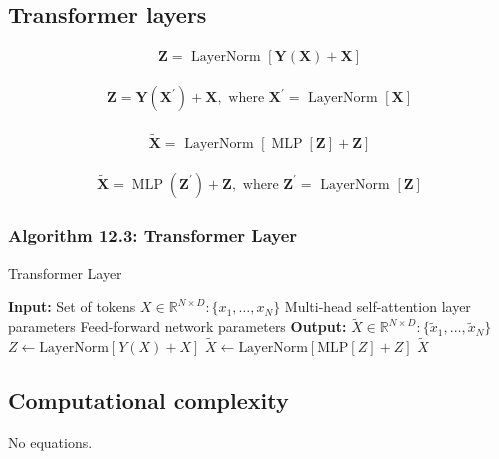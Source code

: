 \documentclass{article}
\begin{document}
\subsection{Transformer layers}
\begin{align*}
\mathbf{Z}=\text{ LayerNorm }[
\mathbf{Y}(\mathbf{X})+\mathbf{X}] \tag{12.20}
\end{align*}

\begin{align*}
\mathbf{Z}=\mathbf{Y}\left(\mathbf{X}^{\prime}\right)+\mathbf{X}, \text{ where } \mathbf{X}^{\prime}=\text{ LayerNorm }[
\mathbf{X}] \tag{12.21}
\end{align*}

\begin{align*}
\widetilde{\mathbf{X}}=\text{ LayerNorm }[
\operatorname{MLP}[
\mathbf{Z}]
+\mathbf{Z}] \tag{12.22}
\end{align*}

\begin{align*}
\widetilde{\mathbf{X}}=\operatorname{MLP}\left(\mathbf{Z}^{\prime}\right)+\mathbf{Z}, \text{ where } \mathbf{Z}^{\prime}=\text{ LayerNorm }[
\mathbf{Z}] \tag{12.23}
\end{align*}

\subsubsection{Algorithm 12.3: Transformer Layer}

\begin{algorithm}[H]
\caption{Transformer Layer}
\begin{algorithmic}[1]
\STATE \textbf{Input:} Set of tokens $X \in \mathbb{R}^{N \times D} : \{x_1, \ldots, x_N\}$
\STATE \quad Multi-head self-attention layer parameters
\STATE \quad Feed-forward network parameters
\STATE \textbf{Output:} $\tilde{X} \in \mathbb{R}^{N \times D} : \{\tilde{x}_1, \ldots, \tilde{x}_N\}$
\STATE $Z \gets \text{LayerNorm}[Y(X) + X]$ 
\STATE $\tilde{X} \gets \text{LayerNorm}[\text{MLP}[Z] + Z]$ 
\RETURN $\tilde{X}$
\end{algorithmic}
\end{algorithm}

\subsection{Computational complexity}

No equations.
\end{document}
